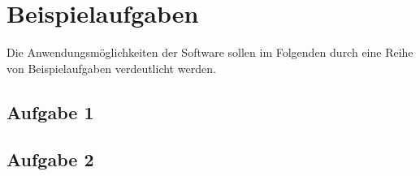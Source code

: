 \chapter{Beispielaufgaben}
\label{sec:exercises}

Die Anwendungsmöglichkeiten der Software sollen im Folgenden durch eine Reihe von Beispielaufgaben verdeutlicht werden.

\section{Aufgabe 1}
\label{sec:exercises:1}

\section{Aufgabe 2}
\label{sec:exercises:2}
